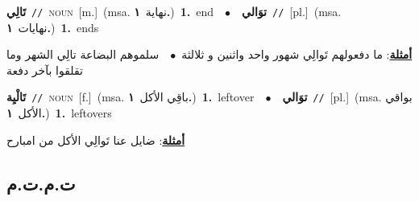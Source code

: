 \documentclass[10pt,a4paper,twoside]{article} %
\begin{document}
\begin{multicols}{2}
{\setlength\topsep{0pt}\textbf{\foreignlanguage{arabic}{تَالِي}}\ {\color{gray}\texttt{//}\color{black}}\ \textsc{noun}\ [m.]\ \color{gray}(msa. \foreignlanguage{arabic}{نهاية}~\foreignlanguage{arabic}{\textbf{١.}})\color{black}\ \textbf{1.}~end\ \ $\bullet$\ \ \setlength\topsep{0pt}\textbf{\foreignlanguage{arabic}{توَالي}}\ {\color{gray}\texttt{//}\color{black}}\ [pl.]\ \color{gray}(msa. \foreignlanguage{arabic}{نهايات}~\foreignlanguage{arabic}{\textbf{١.}})\color{black}\ \textbf{1.}~ends\  \begin{flushright}\color{gray}\foreignlanguage{arabic}{\textbf{\underline{\foreignlanguage{arabic}{أمثلة}}}: ما دفعولهم تَوالِي شهور واحد واثنين و ثلالثة\ $\bullet$\ \  سلموهم البضاعة تالِي الشهر وما تقلقوا بآخر دفعة}\end{flushright}\color{black}} \vspace{2mm}

{\setlength\topsep{0pt}\textbf{\foreignlanguage{arabic}{تَالْيِة}}\ {\color{gray}\texttt{//}\color{black}}\ \textsc{noun}\ [f.]\ \color{gray}(msa. \foreignlanguage{arabic}{باقِي الأكل}~\foreignlanguage{arabic}{\textbf{١.}})\color{black}\ \textbf{1.}~leftover\ \ $\bullet$\ \ \setlength\topsep{0pt}\textbf{\foreignlanguage{arabic}{توَالي}}\ {\color{gray}\texttt{//}\color{black}}\ [pl.]\ \color{gray}(msa. \foreignlanguage{arabic}{بواقي الأكل}~\foreignlanguage{arabic}{\textbf{١.}})\color{black}\ \textbf{1.}~leftovers\  \begin{flushright}\color{gray}\foreignlanguage{arabic}{\textbf{\underline{\foreignlanguage{arabic}{أمثلة}}}: ضايل عنا تَوالِي الأكل من امبارح}\end{flushright}\color{black}} \vspace{2mm}

\vspace{-3mm}
\subsection*{\color{blue}\foreignlanguage{arabic}{ت.م.ت.م}\color{blue}{}} 


\end{multicols}
\end{document}
